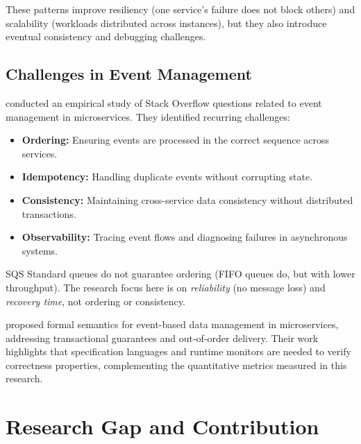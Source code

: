 These patterns improve resiliency (one service's failure does not block others) and scalability (workloads distributed across instances), but they also introduce eventual consistency and debugging challenges.

\subsection{Challenges in Event Management}

\citet{Laigner2024EventChallenges} conducted an empirical study of Stack Overflow questions related to event management in microservices. They identified recurring challenges:
\begin{itemize}
    \item \textbf{Ordering:} Ensuring events are processed in the correct sequence across services.
    \item \textbf{Idempotency:} Handling duplicate events without corrupting state.
    \item \textbf{Consistency:} Maintaining cross-service data consistency without distributed transactions.
    \item \textbf{Observability:} Tracing event flows and diagnosing failures in asynchronous systems.
\end{itemize}

SQS Standard queues do not guarantee ordering (FIFO queues do, but with lower throughput). The research focus here is on \emph{reliability} (no message loss) and \emph{recovery time}, not ordering or consistency.

\citet{Zuckmantel2022EventConsistency} proposed formal semantics for event-based data management in microservices, addressing transactional guarantees and out-of-order delivery. Their work highlights that specification languages and runtime monitors are needed to verify correctness properties, complementing the quantitative metrics measured in this research.

\section{Research Gap and Contribution}


